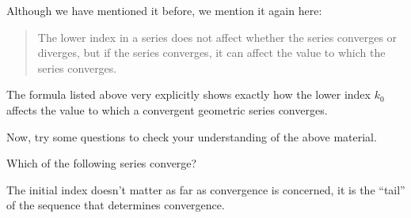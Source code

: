 \documentclass{ximera}
\begin{document}
\begin{remark} 
Although we have mentioned it before, we mention it again here:

\begin{quote}
The lower index in a series does not affect whether the series converges or diverges, but if the series converges, it can affect the value to which the series converges.
\end{quote}
The formula listed above very explicitly shows exactly how the lower index $k_0$ affects the value to which a convergent geometric series converges.

\end{remark}

Now, try some questions to check your understanding of the above material.

\begin{question}
  Which of the following series converge?
  \begin{selectAll}
  \end{selectAll}
  \begin{hint}
    The initial index doesn't matter as far as convergence is
    concerned, it is the ``tail'' of the sequence that determines
    convergence.
  \end{hint}
\end{question}
\end{document}
